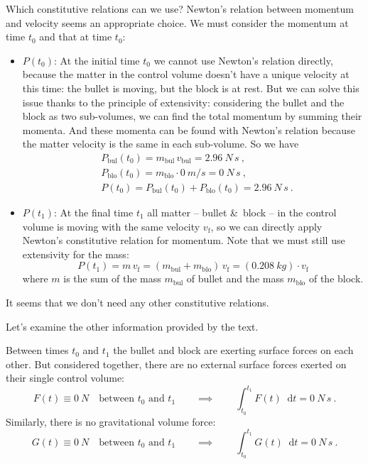 \documentclass[a4paper,12pt,%
onecolumn,oneside,%
british%
]{memoir}
\newcommand*{\amp}{\&}
\newcommand*{\di}{\mathop{}\!\mathrm{d}}%
\renewcommand*{\|}[1][]{\nonscript\:#1\vert\nonscript\:\mathopen{}}
\newcommand*{\yti}{t_{0}}
\newcommand*{\ytf}{t_{1}}
\newcommand*{\dt}{\di t}
\newcommand*{\ym}{m}%
\begin{document}
Which constitutive relations can we use? Newton's relation between momentum and velocity seems an appropriate choice. We must consider the momentum at time $\yti$ and that at time $\yti$:
\begin{itemize}
\item$P(\yti)$: At the initial time $\yti$ we cannot use Newton's relation directly, because the matter in the control volume doesn't have a unique velocity at this time: the bullet is moving, but the block is at rest. But we can solve this issue thanks to the principle of extensivity: considering the bullet and the block as two sub-volumes, we can find the total momentum by summing their momenta. And these momenta can be found with Newton's relation because the matter velocity is the same in each sub-volume. So we have
\begin{equation*}
  \begin{aligned}
    &P_{\textrm{bul}}(\yti) = \ym_{\textrm{bul}}\, v_{\textrm{bul}}
    = \qty{2.96}{N\,s} \ ,
\\
&P_{\textrm{blo}}(\yti) = \ym_{\textrm{blo}}\cdot \qty{0}{m/s}
= \qty{0}{N\,s} \ ,
    \\[1ex]
    &P(\yti) = P_{\textrm{bul}}(\yti) + P_{\textrm{blo}}(\yti)
    = \qty{2.96}{N\,s} \ .
  \end{aligned}
\end{equation*}

\item$P(\ytf)$: At the final time $\ytf$ all matter -- bullet \amp\ block -- in the control volume is moving with the same velocity $v_{\textrm{f}}$, so we can directly apply Newton's constitutive relation for momentum. Note that we must still use extensivity for the mass:
\begin{equation*}
  P(\ytf) = \ym\, v_{\textrm{f}}
  = (\ym_{\textrm{bul}} + \ym_{\textrm{blo}})\, v_{\textrm{f}}
  = (\qty{0.208}{kg})\cdot v_{\textrm{f}}
\end{equation*}
where $\ym$ is the sum of the mass $\ym_{\textrm{bul}}$ of bullet and the mass $\ym_{\textrm{blo}}$ of the block.
\end{itemize}

It seems that we don't need any other constitutive relations.

Let's examine the other information provided by the text.

Between times $\yti$ and $\ytf$ the bullet and block are exerting surface forces on each other. But considered together, there are no external surface forces exerted on their single control volume:
\begin{equation*}
  F(t) \equiv \qty{0}{N}\quad\text{between $\yti$ and $\ytf$}
  \qquad\implies\qquad
  \int_{\yti}^{\ytf}\!F(t)\dt = \qty{0}{N\,s}
  \ .
\end{equation*}
Similarly, there is no gravitational volume force:
\begin{equation*}
  G(t) \equiv \qty{0}{N}\quad\text{between $\yti$ and $\ytf$}
  \qquad\implies\qquad
  \int_{\yti}^{\ytf}\!G(t)\dt = \qty{0}{N\,s}
  \ .
\end{equation*}
\end{document}

